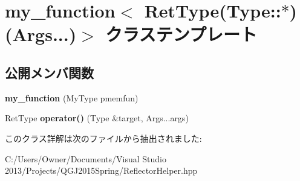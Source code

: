 \hypertarget{classmy__function_3_01_ret_type_07_type_1_1_5_08_07_args_8_8_8_08_4}{}\section{my\+\_\+function$<$ Ret\+Type(Type\+:\+:$\ast$)(Args...)$>$ クラステンプレート}
\label{classmy__function_3_01_ret_type_07_type_1_1_5_08_07_args_8_8_8_08_4}
\subsection*{公開メンバ関数}
\begin{DoxyCompactItemize}
\item 
{\bfseries my\+\_\+function} (My\+Type pmemfun)\hypertarget{classmy__function_3_01_ret_type_07_type_1_1_5_08_07_args_8_8_8_08_4_a4e471ce7d39dd4687690396500d7dc32}{}\label{classmy__function_3_01_ret_type_07_type_1_1_5_08_07_args_8_8_8_08_4_a4e471ce7d39dd4687690396500d7dc32}

\item 
Ret\+Type {\bfseries operator()} (Type \&target, Args...\+args)\hypertarget{classmy__function_3_01_ret_type_07_type_1_1_5_08_07_args_8_8_8_08_4_a6f50e876db1e547b6ebf4ed8ab3bc90f}{}\label{classmy__function_3_01_ret_type_07_type_1_1_5_08_07_args_8_8_8_08_4_a6f50e876db1e547b6ebf4ed8ab3bc90f}

\end{DoxyCompactItemize}


このクラス詳解は次のファイルから抽出されました\+:\begin{DoxyCompactItemize}
\item 
C\+:/\+Users/\+Owner/\+Documents/\+Visual Studio 2013/\+Projects/\+Q\+G\+J2015\+Spring/Reflector\+Helper.\+hpp\end{DoxyCompactItemize}
